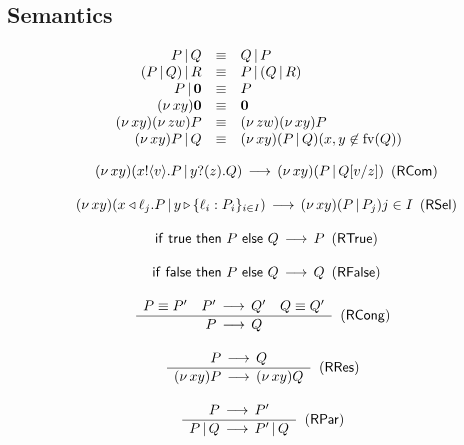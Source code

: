 \subsection{Semantics}

\begin{definition}
\label{def:structural_congruence}
	\vspace{-3mm}
	\[
	\begin{array}{rcl}
    P \,|\, Q & \equiv & Q \,|\, P
    \\
    (P \,|\, Q) \,|\, R & \equiv & P \,|\, (Q \,|\, R)
    \\
    P \,|\, \mathbf{0} & \equiv & P
    \\
    (\nu\,xy) \mathbf{0} & \equiv & \mathbf{0}
    \\
    (\nu\,xy)(\nu\,zw)P & \equiv & (\nu\,zw)(\nu\,xy)P
    \\
    (\nu\,xy)P \,|\, Q &\equiv& (\nu\,xy)(P \,|\, Q) (x, y \not\in \mathrm{fv}(Q))
    \\
	\end{array}
	\]
\end{definition}
\vspace{-6mm}


\begin{definition}
  \label{def:reduction}
	\vspace{-2mm}
	\[
	\begin{array}{c}
	  \tree{}{}{ \newn{xy}(\pout{x}{v} P \pll \pin{y}{z} Q) \reduces \newn{xy} (P \pll Q \subs{v}{z})}{\RCom}
		\\ \\
		\tree{}{}{ \newn{xy}(\sel{x}{\ell_j} P \pll \branch{y}{\ell_i: P_i}_{i \in I}) \reduces \newn{xy} (P \pll P_j) j \in I}{\RSel}
		\\ \\
    \tree{}{}{  \If\ \true\ \Then\ P\ \Else\ Q \reduces P}{\True}
		\\ \\
		\tree{}{}{  \If\ \false\ \Then\ P\ \Else\ Q \reduces Q}{\False}
    \\ \\
    \tree{
      P \equiv P^\prime
      \andalso
      P^\prime \reduces Q^\prime
      \andalso
      Q \equiv Q^\prime
    }{
      P \reduces Q
    }{}{\RCong}
    \\ \\
    \tree{
      P \reduces Q
    }{
      \newn{xy} P
      \reduces
      \newn{xy} Q
    }{}{\RRes}
		\\ \\
    \tree{
      P \reduces P^\prime
    }{
      P \pll Q
      \reduces
      P^\prime \pll Q
    }{}{\RPar}
	\end{array}
	\]
\end{definition}
\vspace{-2mm}

